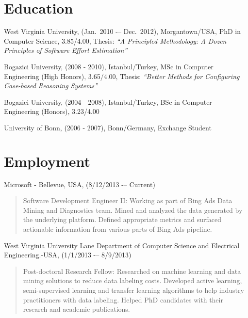 \documentclass[margin]{res}
\begin{document}
\begin{resume}
\section{Education}
\begin{list}{}{\leftmargin=0.5em}
\item West Virginia University, (Jan.~2010 -– Dec.~2012), Morgantown/USA, PhD in Computer Science, 3.85/4.00, Thesis: \textit{``A Principled Methodology: A Dozen Principles of Software Effort Estimation''}
\item Bogazici University, (2008 - 2010), Istanbul/Turkey, MSc in Computer Engineering (High Honors), 3.65/4.00,
Thesis: \textit{``Better Methods for Configuring Case-based Reasoning Systems''}
\item Bogazici University, (2004 - 2008), Istanbul/Turkey, BSc in Computer Engineering (Honors), 3.23/4.00
\item University of Bonn, (2006 - 2007), Bonn/Germany, Exchange Student
\end{list}

\section{Employment} 

\begin{list}{}{\leftmargin=0.5em}

\item Microsoft - Bellevue, USA, (8/12/2013 -– Current) 
\begin{quote}
Software Development Engineer II: Working as part of Bing Ads Data Mining and Diagnostics team. Mined and analyzed the data generated by the underlying platform.  Defined appropriate metrics and surfaced actionable information from various parts of Bing Ads pipeline.
\end{quote}

\item West Virginia University Lane Department of Computer Science and Electrical Engineering.-USA, (1/1/2013 -– 8/9/2013) 
\begin{quote}
Post-doctoral Research Fellow: Researched on machine learning and data mining solutions to reduce data labeling costs. Developed active learning, semi-supervised learning and transfer learning algorithms to help industry practitioners with data labeling. Helped PhD candidates with their research and academic publications.
\end{quote}


\end{list}
\end{resume}
\end{document}
